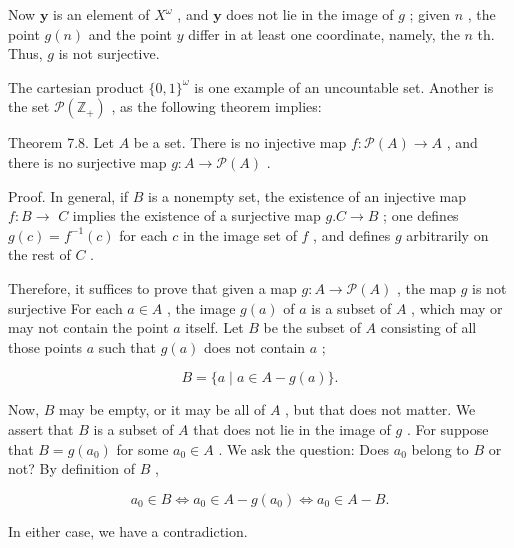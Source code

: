 Now \(\mathbf{y}\) is an element of \({X}^{\omega }\) , and \(\mathbf{y}\) does not lie in the image of \(g\) ; given \(n\) , the point \(g\left( n\right)\) and the point \(y\) differ in at least one coordinate, namely, the \(n\) th. Thus, \(g\) is not surjective.

The cartesian product \(\{ 0,1{\} }^{\omega }\) is one example of an uncountable set. Another is the set \(\mathcal{P}\left( {\mathbb{Z}}_{ + }\right)\) , as the following theorem implies:

Theorem 7.8. Let \(A\) be a set. There is no injective map \(f : \mathcal{P}\left( A\right)  \rightarrow  A\) , and there is no surjective map \(g : A \rightarrow  \mathcal{P}\left( A\right)\) .

Proof. In general, if \(B\) is a nonempty set, the existence of an injective map \(f : B \rightarrow\)  \(C\) implies the existence of a surjective map \(g.C \rightarrow  B\) ; one defines \(g\left( c\right)  = {f}^{-1}\left( c\right)\) for each \(c\) in the image set of \(f\) , and defines \(g\) arbitrarily on the rest of \(C\) .

Therefore, it suffices to prove that given a map \(g : A \rightarrow  \mathcal{P}\left( A\right)\) , the map \(g\) is not surjective For each \(a \in  A\) , the image \(g\left( a\right)\) of \(a\) is a subset of \(A\) , which may or may not contain the point \(a\) itself. Let \(B\) be the subset of \(A\) consisting of all those points \(a\) such that \(g\left( a\right)\) does not contain \(a\) ;

\[
B = \{ a \mid  a \in  A - g\left( a\right) \} .
\]

Now, \(B\) may be empty, or it may be all of \(A\) , but that does not matter. We assert that \(B\) is a subset of \(A\) that does not lie in the image of \(g\) . For suppose that \(B = g\left( {a}_{0}\right)\) for some \({a}_{0} \in  A\) . We ask the question: Does \({a}_{0}\) belong to \(B\) or not? By definition of \(B\) ,

\[
{a}_{0} \in  B \Leftrightarrow  {a}_{0} \in  A - g\left( {a}_{0}\right)  \Leftrightarrow  {a}_{0} \in  A - B.
\]

In either case, we have a contradiction.

